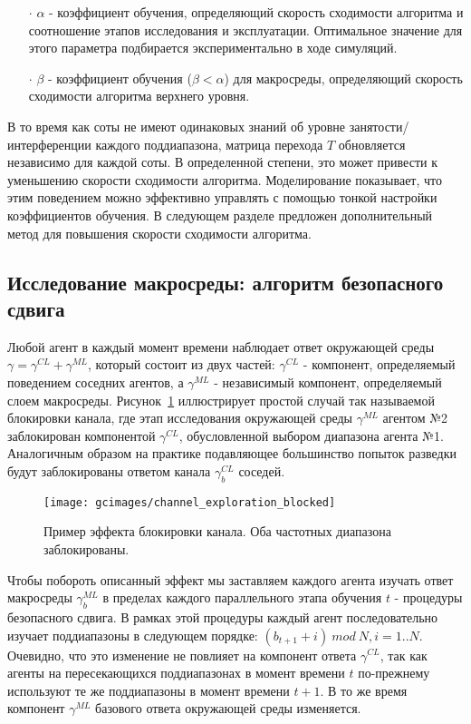 \begin{itemize}
\item[$\cdot$]$ \alpha$ - коэффициент обучения, определяющий скорость сходимости алгоритма и соотношение этапов исследования и эксплуатации. Оптимальное значение для этого параметра подбирается экспериментально в ходе симуляций.
\item[$\cdot$] $\beta$ - коэффициент обучения ($\beta < \alpha$) для макросреды, определяющий скорость сходимости алгоритма верхнего уровня.
\end{itemize} 

В то время как соты не имеют одинаковых знаний об уровне занятости/интерференции каждого поддиапазона, матрица перехода $T$ обновляется независимо для каждой соты. В определенной степени, это может привести к уменьшению скорости сходимости алгоритма. Моделирование показывает, что этим поведением можно эффективно управлять с помощью тонкой настройки коэффициентов обучения. В следующем разделе предложен дополнительный метод для повышения скорости сходимости алгоритма.

\subsection{Исследование макросреды: алгоритм безопасного сдвига}
\label{sec:safe_shift}
Любой агент в каждый момент времени наблюдает ответ окружающей среды $\gamma = \gamma^{CL} + \gamma^{ML}$, который состоит из двух частей: $\gamma^{CL}$ - компонент, определяемый поведением соседних агентов, а $\gamma^{ML}$ - независимый компонент, определяемый слоем макросреды.
Рисунок~\ref{fig:channel_exploration_blocked} иллюстрирует простой случай так называемой блокировки канала, где этап исследования окружающей среды $\gamma^{ML}$ агентом №2 заблокирован компонентой $\gamma^{CL}$, обусловленной выбором диапазона агента №1. Аналогичным образом на практике подавляющее большинство попыток разведки будут заблокированы ответом канала $\gamma_b^{CL}$ соседей. 

\begin{figure}
    \centering
    \texttt{[image: gcimages/channel\_exploration\_blocked]}
    \caption{Пример эффекта блокировки канала. Оба частотных диапазона заблокированы.}
    \label{fig:channel_exploration_blocked}
\end{figure}

Чтобы побороть описанный эффект мы заставляем каждого агента изучать ответ макросреды $\gamma_b^{ML}$ в пределах каждого параллельного этапа обучения $t$ - процедуры безопасного сдвига. В рамках этой процедуры каждый агент последовательно изучает поддиапазоны в следующем порядке: ${(b_{t+1}+i)~mod~N}, i=1..N$. Очевидно, что это изменение не повлияет на компонент ответа $\gamma^{CL}$, так как агенты на пересекающихся поддиапазонах в момент времени $t$ по-прежнему используют те же поддиапазоны в момент времени ${t+1}$. В то же время компонент $\gamma^{ML}$ базового ответа окружающей среды изменяется.

